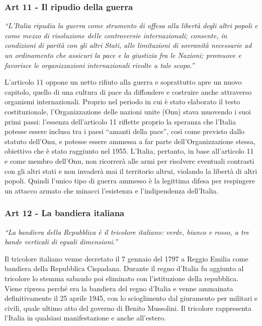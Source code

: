 \documentclass{report}
\begin{document}


\subsubsection{Art 11 - Il ripudio della guerra}
\textit{“L'Italia ripudia la guerra come strumento di offesa alla libertà degli altri popoli e come mezzo di risoluzione delle
controversie internazionali; consente, in condizioni di parità con gli altri Stati, alle limitazioni di sovranità necessarie
ad un ordinamento che assicuri la pace e la giustizia fra le Nazioni; promuove e favorisce le organizzazioni
internazionali rivolte a tale scopo.”}

L’articolo 11 oppone un netto rifiuto alla guerra e soprattutto apre un nuovo capitolo, quello di una cultura di
pace da diffondere e costruire anche attraverso organismi internazionali.
Proprio nel periodo in cui è stato elaborato il testo costituzionale, l’Organizzazione delle nazioni unite (Onu) stava
muovendo i suoi primi passi: l’essenza dell’articolo 11 riflette proprio la speranza che l’Italia potesse essere inclusa tra i
paesi “amanti della pace”, così come previsto dallo statuto dell’Onu, e potesse essere ammessa a far parte
dell’Organizzazione stessa, obiettivo che è stato raggiunto nel 1955.
L’Italia, pertanto, in base all’articolo 11 e come membro dell’Onu, non ricorrerà alle armi per risolvere
eventuali contrasti con gli altri stati e non invaderà mai il territorio altrui, violando la libertà di altri popoli.
Quindi l’unico tipo di guerra ammesso è la legittima difesa per respingere un attacco armato che minacci
l’esistenza e l’indipendenza dell’Italia.

\subsubsection{Art 12 - La bandiera italiana}

\textit{“La bandiera della Repubblica è il tricolore italiano: verde, bianco e rosso, a tre bande verticali di eguali dimensioni.”}

Il tricolore italiano venne decretato il 7 gennaio del 1797 a Reggio Emilia come bandiera della Repubblica Cispadana.
Durante il regno d’Italia fu aggiunto al tricolore lo stemma sabaudo poi eliminato con l’istituzione della repubblica.
Viene ripresa perché era la bandiera del regno d’Italia e venne ammainata definitivamente il 25 aprile 1945, con lo
scioglimento dal giuramento per militari e civili, quale ultimo atto del governo di Benito Mussolini. Il tricolore
rappresenta l’Italia in qualsiasi manifestazione e anche all’estero.
\end{document}
